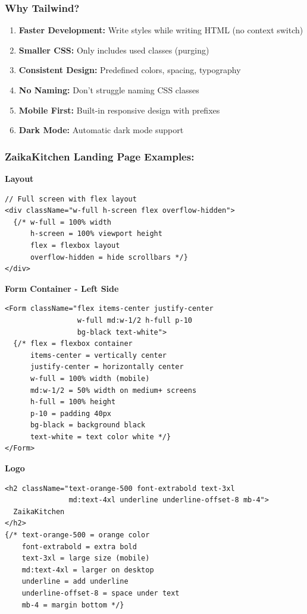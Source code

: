 \documentclass[12pt]{article}
\begin{document}
\subsubsection*{Why Tailwind?}

\begin{enumerate}
    \item \textbf{Faster Development:} Write styles while writing HTML (no context switch)
    \item \textbf{Smaller CSS:} Only includes used classes (purging)
    \item \textbf{Consistent Design:} Predefined colors, spacing, typography
    \item \textbf{No Naming:} Don't struggle naming CSS classes
    \item \textbf{Mobile First:} Built-in responsive design with prefixes
    \item \textbf{Dark Mode:} Automatic dark mode support
\end{enumerate}

\subsubsection*{ZaikaKitchen Landing Page Examples:}

\textbf{Layout}

\begin{lstlisting}
// Full screen with flex layout
<div className="w-full h-screen flex overflow-hidden">
  {/* w-full = 100% width
      h-screen = 100% viewport height
      flex = flexbox layout
      overflow-hidden = hide scrollbars */}
</div>
\end{lstlisting}

\textbf{Form Container - Left Side}

\begin{lstlisting}
<Form className="flex items-center justify-center 
                 w-full md:w-1/2 h-full p-10 
                 bg-black text-white">
  {/* flex = flexbox container
      items-center = vertically center
      justify-center = horizontally center
      w-full = 100% width (mobile)
      md:w-1/2 = 50% width on medium+ screens
      h-full = 100% height
      p-10 = padding 40px
      bg-black = background black
      text-white = text color white */}
</Form>
\end{lstlisting}

\textbf{Logo}

\begin{lstlisting}
<h2 className="text-orange-500 font-extrabold text-3xl 
               md:text-4xl underline underline-offset-8 mb-4">
  ZaikaKitchen
</h2>
{/* text-orange-500 = orange color
    font-extrabold = extra bold
    text-3xl = large size (mobile)
    md:text-4xl = larger on desktop
    underline = add underline
    underline-offset-8 = space under text
    mb-4 = margin bottom */}
\end{lstlisting}
\end{document}
